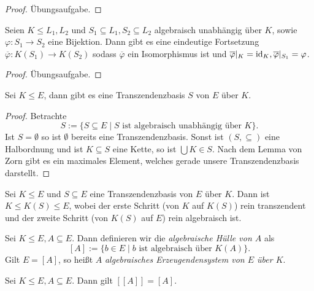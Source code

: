 \begin{proof}
    Übungsaufgabe.
\end{proof}

\begin{proposition}
    Seien $K \leq L_1, L_2$ und $S_1 \subseteq L_1, S_2 \subseteq L_2$ algebraisch unabhängig über $K$, sowie $\varphi : S_1 \to S_2$ eine Bijektion. Dann gibt es eine eindeutige Fortsetzung $\overline{\varphi} : K(S_1) \to K(S_2)$ sodass $\overline{\varphi}$ ein Isomorphismus ist und $\overline{\varphi} \vert_K = \operatorname{id}_K, \overline{\varphi} \vert_{S_1} = \varphi$.
\end{proposition}

\begin{proof}
    Übungsaufgabe.
\end{proof}

\begin{proposition}
    Sei $K \leq E$, dann gibt es eine Transzendenzbasis $S$ von $E$ über $K$.
\end{proposition}

\begin{proof}
    Betrachte
    $$ S := \{ S \subseteq E \mid S \text{ ist algebraisch unabhängig über } K \}. $$
    Ist $S = \emptyset$ so ist $\emptyset$ bereits eine Transzendenzbasis. Sonst ist $(S, \subseteq)$ eine Halbordnung und ist $K \subseteq S$ eine Kette, so ist $\bigcup K \in S$. Nach dem Lemma von Zorn gibt es ein maximales Element, welches gerade unsere Transzendenzbasis darstellt.
\end{proof}

\begin{corollary}
    Sei $K \leq E$ und $S \subseteq E$ eine Transzendenzbasis von $E$ über $K$. Dann ist $K \leq K(S) \leq E$, wobei der erste Schritt (von $K$ auf $K(S)$) rein transzendent und der zweite Schritt (von $K(S)$ auf $E$) rein algebraisch ist.
\end{corollary}

\begin{definition}
    Sei $K \leq E, A \subseteq E$. Dann definieren wir die \emph{algebraische Hülle von $A$} als
    $$ [A] := \{ b \in E \mid b \text{ ist algebraisch über } K(A) \}. $$
    Gilt $E = [A]$, so heißt $A$ \emph{algebraisches Erzeugendensystem von $E$ über $K$}.
\end{definition}

\begin{lemma}
    Sei $K \leq E, A \subseteq E$. Dann gilt $[[A]] = [A]$.
\end{lemma}


